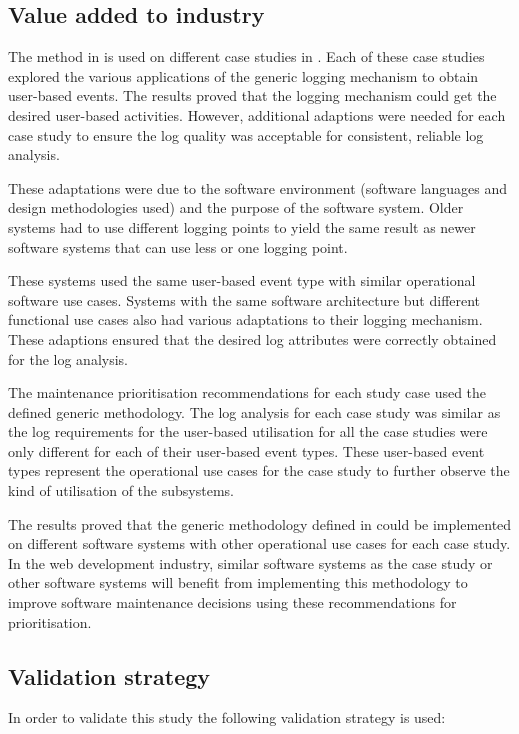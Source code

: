 \subsection{Value added to industry}
The method in  is used on different case studies in . Each of these case studies explored the various applications of the generic logging mechanism to obtain user-based events. The results proved that the logging mechanism could get the desired user-based activities. However, additional adaptions were needed for each case study to ensure the log quality was acceptable for consistent, reliable log analysis.\par These adaptations were due to the software environment (software languages and design methodologies used) and the purpose of the software system. Older systems had to use different logging points to yield the same result as newer software systems that can use less or one logging point.\par These systems used the same user-based event type with similar operational software use cases. Systems with the same software architecture but different functional use cases also had various adaptations to their logging mechanism. These adaptions ensured that the desired log attributes were correctly obtained for the log analysis. \par The maintenance prioritisation recommendations for each study case used the defined generic methodology. The log analysis for each case study was similar as the log requirements for the user-based utilisation for all the case studies were only different for each of their user-based event types. These user-based event types represent the operational use cases for the case study to further observe the kind of utilisation of the subsystems. \par The results proved that the generic methodology defined in  could be implemented on different software systems with other operational use cases for each case study. In the web development industry, similar software systems as the case study or other software systems will benefit from implementing this methodology to improve software maintenance decisions using these recommendations for prioritisation.

\subsection{Validation strategy}
In order to validate this study the following validation strategy is used:

